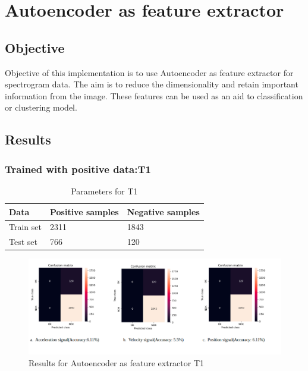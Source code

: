    \chapter{Autoencoder as feature extractor}  
   \section{Objective} 
   Objective of this implementation is to use Autoencoder as feature extractor for spectrogram data. The aim is to reduce the dimensionality and retain important information from the image. These features can be used as an aid to classification or clustering model. 
   
   \section{Results}
   \subsection{Trained with positive data:T1}
   \begin{table}[h]
   	\begin{tabular}{|l|l|l|}
   		\hline
   		Data      & Positive samples & Negative samples \\ \hline
   		Train set & 2311             & 1843             \\ \hline
   		Test set  & 766              & 120              \\ \hline
   	\end{tabular}
   	\caption{Parameters for T1}
   \end{table}
       \begin{figure}[h]
       	\centering
       	\includegraphics[width=1\linewidth]{images/rr6.png}
       	\caption{Results for Autoencoder as feature extractor T1}
       	\label{kk}
       \end{figure}
   
